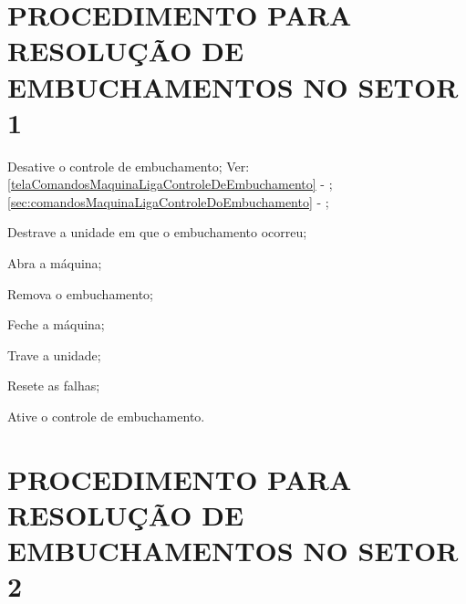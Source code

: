 \ifmachineType
  \newpage
  \thispagestyle{fancy}
  \vspace*{40 pt}
\fi

\section{\large{PROCEDIMENTO PARA RESOLUÇÃO DE EMBUCHAMENTOS NO SETOR 1}}



\begin{procedureFixingIsuesSector1}

  \item[\ding{\dingNumber}] Desative o controle de embuchamento; Ver: 
  \ifmachineType
  \ref{telaComandosMaquinaLigaControleDeEmbuchamento} - ;
  \else
  \ref{sec:comandosMaquinaLigaControleDoEmbuchamento} - ;
  \fi
  \ifmachineType
  \item[\ding{\dingNumber}] Destrave a unidade em que o embuchamento ocorreu;
  \item[\ding{\dingNumber}] Abra a máquina;
  \fi
  \item[\ding{\dingNumber}] Remova o embuchamento;
  \ifmachineType
  \item[\ding{\dingNumber}] Feche a máquina;
  \item[\ding{\dingNumber}] Trave a unidade;
  \fi
  \item[\ding{\dingNumber}] Resete as falhas;
  \item[\ding{\dingNumber}] Ative o controle de embuchamento.
  
\end{procedureFixingIsuesSector1}

\section{\large{PROCEDIMENTO PARA RESOLUÇÃO DE EMBUCHAMENTOS NO SETOR 2}}



